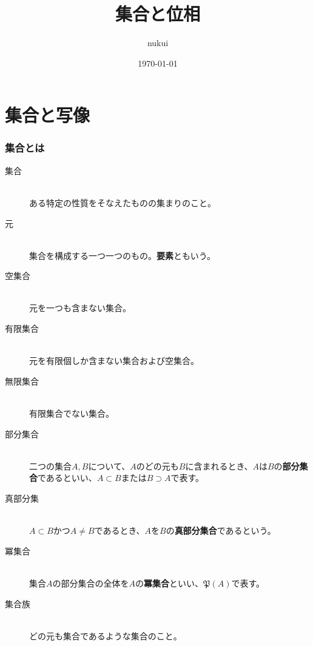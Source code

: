 \documentclass{jsarticle}
\begin{document}
\title{集合と位相}
\author{nukui}
\date{\today}
\maketitle


\part{集合と写像}
\section{集合とは}
\begin{screen}
\begin{description}
\item[集合]\mbox{}\\ある特定の性質をそなえたものの集まりのこと。
\item[元]\mbox{}\\集合を構成する一つ一つのもの。{\bf 要素}ともいう。
\item[空集合]\mbox{}\\元を一つも含まない集合。
\item[有限集合]\mbox{}\\元を有限個しか含まない集合および空集合。
\item[無限集合]\mbox{}\\有限集合でない集合。
\item[部分集合]\mbox{}\\二つの集合$A,B$について、$A$のどの元も$B$に含まれるとき、$A$は$B$の{\bf 部分集合}であるといい、$A\subset B$または$B\supset A$で表す。
\item[真部分集]\mbox{}\\$A\subset B$かつ$A\neq B$であるとき、$A$を$B$の{\bf 真部分集合}であるという。
\item[冪集合]\mbox{}\\集合$A$の部分集合の全体を$A$の{\bf 冪集合}といい、$\mathfrak{P}(A)$で表す。
\item[集合族]\mbox{}\\どの元も集合であるような集合のこと。
\end{description}
\end{screen}

\end{document}
